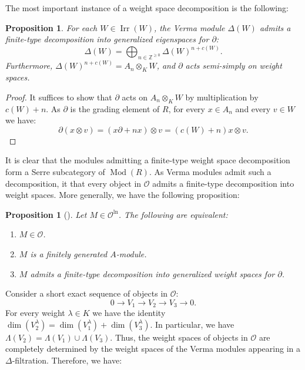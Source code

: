 \documentclass{amsart}
\newtheorem{prop}[defi]{ Proposition}
\newcommand{\Mod}{\operatorname{Mod}}
\newcommand{\OX}{\mathcal{O}}
\begin{document}
The most important instance of a weight space decomposition is the following:
\begin{prop}\label{eigenspace structure for algebraic Verma modules}
For each $W\in \operatorname{Irr}(W)$, the Verma module $\Delta(W)$ admits a finite-type decomposition into generalized eigenspaces for $\partial$:
\begin{equation*}
    \Delta(W)=\bigoplus_{n\in \mathbb{Z}^{\geq 0}}\Delta(W)^{n+c(W)}.
\end{equation*}   
Furthermore, $\Delta(W)^{n+c(W)}=A_n\otimes_KW$, and  $\partial$ acts semi-simply on weight spaces.
\end{prop}
\begin{proof}
It suffices to show that $\partial$ acts on $A_n\otimes_KW$ by multiplication by $c(W)+n$. As $\partial$ is the grading element of $R$, for every $x\in A_n$ and every $v\in W$ we have:
\begin{equation*}
    \partial(x\otimes v)=(x\partial  +   nx)\otimes v= (c(W)+n)x\otimes v.
\end{equation*}
\end{proof}
It is clear that the modules admitting a finite-type weight space decomposition form a Serre subcategory of $\Mod(R)$. As Verma modules admit such a decomposition, it that every object in $\OX$ admits a finite-type decomposition into weight spaces. More generally, we have the following proposition:
\begin{prop}[{\cite[Lemma 2.22]{ginzburg2003category}}]\label{prop equiv conditions category O}
Let $M\in \OX^{\operatorname{ln}}$. The following are equivalent:
\begin{enumerate}[label=(\roman*)]
    \item $M\in \OX$.
    \item $M$ is a finitely generated $A$-module.
    \item $M$ admits a finite-type decomposition into generalized weight spaces for $\partial$.
\end{enumerate}
\end{prop}
Consider a short exact sequence of objects in $\OX$:
\begin{equation*}
    0\rightarrow V_1\rightarrow V_2\rightarrow V_3\rightarrow 0.
\end{equation*}
For every weight $\lambda\in K$ we have the identity $\operatorname{dim}(V_2^\lambda)=\operatorname{dim}(V_{1}^\lambda)+\operatorname{dim}(V_{3}^\lambda)$.
In particular, we have $\Lambda(V_2)=\Lambda(V_1)\cup \Lambda(V_3)$. Thus, the weight spaces of objects in $\OX$ are completely determined by the weight spaces of the Verma modules appearing in a $\Delta$-filtration. Therefore, we have:
\end{document}
